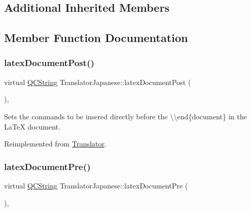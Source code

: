 \subsection*{Additional Inherited Members}


\subsection{Member Function Documentation}
\mbox{\label{class_translator_japanese_a42f015953ee9043a126064c16fccae46}} 
\subsubsection{\texorpdfstring{latexDocumentPost()}{latexDocumentPost()}}
{\footnotesize\ttfamily virtual \mbox{\hyperlink{class_q_c_string}{Q\+C\+String}} Translator\+Japanese\+::latex\+Document\+Post (\begin{DoxyParamCaption}{ }\end{DoxyParamCaption})\hspace{0.3cm}{\ttfamily [inline]}, {\ttfamily [virtual]}}

Sets the commands to be insered directly before the {\ttfamily \textbackslash{}\textbackslash{}end\{document\}} in the La\+TeX document. 

Reimplemented from \mbox{\hyperlink{class_translator_a4bcba7a46f227760b534b35760688da6}{Translator}}.

\mbox{\label{class_translator_japanese_abcfec41fcfaf972e191aa2bf14057b2f}} 
\subsubsection{\texorpdfstring{latexDocumentPre()}{latexDocumentPre()}}
{\footnotesize\ttfamily virtual \mbox{\hyperlink{class_q_c_string}{Q\+C\+String}} Translator\+Japanese\+::latex\+Document\+Pre (\begin{DoxyParamCaption}{ }\end{DoxyParamCaption})\hspace{0.3cm}{\ttfamily [inline]}, {\ttfamily [virtual]}}

